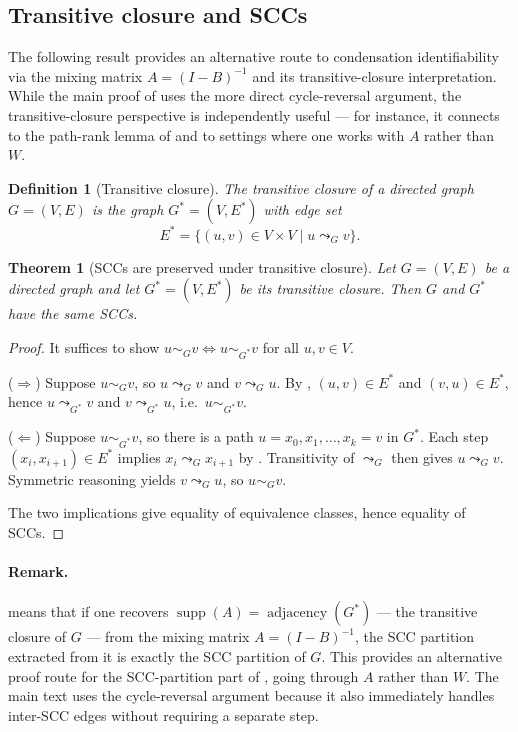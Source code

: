\documentclass{article}
\newtheorem{theorem}{Theorem}
\newtheorem{definition}{Definition}
\begin{document}
\subsection{Transitive closure and SCCs}
\label{app:transitive-closure}

The following result provides an alternative route to condensation identifiability via the mixing matrix $A = (I-B)^{-1}$ and its transitive-closure interpretation. While the main proof of  uses the more direct cycle-reversal argument, the transitive-closure perspective is independently useful --- for instance, it connects to the path-rank lemma of \citet{dai2026distributional} and to settings where one works with $A$ rather than $W$.

\begin{definition}[Transitive closure]
\label{def:transitive-closure}
The \emph{transitive closure} of a directed graph $G = (V, E)$ is the graph $G^* = (V, E^*)$ with edge set
\[
E^* = \{ (u, v) \in V \times V \mid u \leadsto_G v \}.
\]
\end{definition}

\begin{theorem}[SCCs are preserved under transitive closure]
\label{thm:scc-tc}
Let $G = (V, E)$ be a directed graph and let $G^* = (V, E^*)$ be its transitive closure. Then $G$ and $G^*$ have the same SCCs.
\end{theorem}

\begin{proof}
It suffices to show $u \sim_G v \iff u \sim_{G^*} v$ for all $u, v \in V$.

\noindent($\Rightarrow$) Suppose $u \sim_G v$, so $u \leadsto_G v$ and $v \leadsto_G u$. By , $(u, v) \in E^*$ and $(v, u) \in E^*$, hence $u \leadsto_{G^*} v$ and $v \leadsto_{G^*} u$, i.e.\ $u \sim_{G^*} v$.

\noindent($\Leftarrow$) Suppose $u \sim_{G^*} v$, so there is a path $u = x_0, x_1, \dots, x_k = v$ in $G^*$. Each step $(x_i, x_{i+1}) \in E^*$ implies $x_i \leadsto_G x_{i+1}$ by . Transitivity of $\leadsto_G$ then gives $u \leadsto_G v$. Symmetric reasoning yields $v \leadsto_G u$, so $u \sim_G v$.

The two implications give equality of equivalence classes, hence equality of SCCs.
\end{proof}

\paragraph{Remark.}  means that if one recovers $\operatorname{supp}(A) = \operatorname{adjacency}(G^*)$ --- the transitive closure of $G$ --- from the mixing matrix $A = (I-B)^{-1}$, the SCC partition extracted from it is exactly the SCC partition of $G$. This provides an alternative proof route for the SCC-partition part of , going through $A$ rather than $W$. The main text uses the cycle-reversal argument because it also immediately handles inter-SCC edges without requiring a separate step.


\newpage

\end{document}
